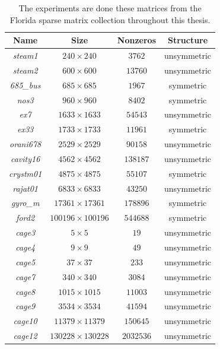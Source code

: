 \documentclass[12pt, twoside,a4paper,toc=bibliography]{scrbook}
\begin{document}
\begin{table}
\centering
\begin{tabular}{|c|c|c|c|}
\hline
Name & Size & Nonzeros & Structure\\\hline
\textit{steam1} & $240\times 240$ & $3762$ & unsymmetric \\\hline
\textit{steam2} & $600\times 600$ & $13760$ & unsymmetric \\\hline
\textit{685\_bus} & $685\times 685$ & $1967$ & symmetric \\\hline
\textit{nos3} & $960\times 960$ & $8402$ & symmetric \\\hline
\textit{ex7} & $1633\times 1633$ & $54543$ & unsymmetric \\\hline
\textit{ex33} & $1733\times 1733$ & $11961$ & symmetric\\\hline
\textit{orani678} & $2529\times 2529$ & $90158$ & unsymmetric \\\hline
\textit{cavity16} & $4562\times 4562$ & $138187$ & unsymmetric \\\hline
\textit{crystm01} &$4875\times 4875$ & $55107$& symmetric\\\hline
\textit{rajat01} & $6833\times 6833$ & $43250$ & unsymmetric\\\hline
\textit{gyro\_m} & $17361\times 17361$ & $178896$ & symmetric\\\hline
\textit{ford2} & $100196\times 100196$ & $544688$ & symmetric \\\hline
\textit{cage3} & $5\times 5$ & $19$ & unsymmetric\\\hline
\textit{cage4} & $9\times 9$ & $49$ & unsymmetric\\\hline
\textit{cage5} & $37\times 37$ & $233$ & unsymmetric\\\hline
\textit{cage7} & $340\times 340$  & $3084$ & unsymmetric\\\hline
\textit{cage8} & $1015\times 1015$  & $11003$ & unsymmetric\\\hline
\textit{cage9} & $3534\times 3534$  & $41594$ & unsymmetric\\\hline
\textit{cage10} & $11379\times 11379$ & $150645$& unsymmetric\\\hline
\textit{cage12} & $130228\times 130228$ &  $2032536$ & unsymmetric\\\hline
\end{tabular}
\caption{The experiments are done these matrices
from the Florida sparse matrix collection throughout this thesis.}
\label{florida.mats}
\end{table}
\end{document}
